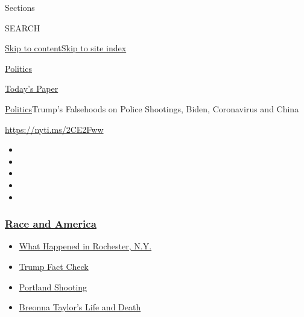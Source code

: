 Sections

SEARCH

\protect\hyperlink{site-content}{Skip to
content}\protect\hyperlink{site-index}{Skip to site index}

\href{https://www.nytimes3xbfgragh.onion/section/politics}{Politics}

\href{https://myaccount.nytimes3xbfgragh.onion/auth/login?response_type=cookie\&client_id=vi}{}

\href{https://www.nytimes3xbfgragh.onion/section/todayspaper}{Today's
Paper}

\href{/section/politics}{Politics}\textbar{}Trump's Falsehoods on Police
Shootings, Biden, Coronavirus and China

\url{https://nyti.ms/2CE2Fww}

\begin{itemize}
\item
\item
\item
\item
\item
\end{itemize}

\hypertarget{race-and-america}{%
\subsubsection{\texorpdfstring{\href{https://www.nytimes3xbfgragh.onion/news-event/george-floyd-protests-minneapolis-new-york-los-angeles?name=styln-george-floyd\&region=TOP_BANNER\&block=storyline_menu_recirc\&action=click\&pgtype=Article\&impression_id=c831dc30-f2d8-11ea-a5b3-8155027c1ab2\&variant=undefined}{Race
and America}}{Race and America}}\label{race-and-america}}

\begin{itemize}
\tightlist
\item
  \href{https://www.nytimes3xbfgragh.onion/2020/09/04/nyregion/rochester-police-daniel-prude.html?name=styln-george-floyd\&region=TOP_BANNER\&block=storyline_menu_recirc\&action=click\&pgtype=Article\&impression_id=c8320340-f2d8-11ea-a5b3-8155027c1ab2\&variant=undefined}{What
  Happened in Rochester, N.Y.}
\item
  \href{https://www.nytimes3xbfgragh.onion/2020/09/01/us/politics/trump-fact-check-protests.html?name=styln-george-floyd\&region=TOP_BANNER\&block=storyline_menu_recirc\&action=click\&pgtype=Article\&impression_id=c8320341-f2d8-11ea-a5b3-8155027c1ab2\&variant=undefined}{Trump
  Fact Check}
\item
  \href{https://www.nytimes3xbfgragh.onion/2020/08/30/us/portland-shooting-explained.html?name=styln-george-floyd\&region=TOP_BANNER\&block=storyline_menu_recirc\&action=click\&pgtype=Article\&impression_id=c8320342-f2d8-11ea-a5b3-8155027c1ab2\&variant=undefined}{Portland
  Shooting}
\item
  \href{https://www.nytimes3xbfgragh.onion/2020/08/30/us/breonna-taylor-police-killing.html?name=styln-george-floyd\&region=TOP_BANNER\&block=storyline_menu_recirc\&action=click\&pgtype=Article\&impression_id=c8320343-f2d8-11ea-a5b3-8155027c1ab2\&variant=undefined}{Breonna
  Taylor's Life and Death}
\end{itemize}

